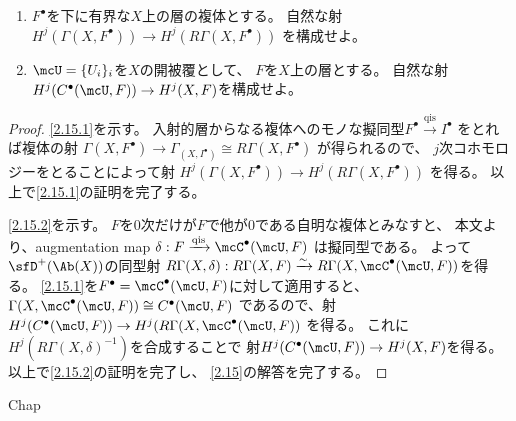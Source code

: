 \documentclass[uplatex,dvipdfmx]{jsarticle}
\begin{document}
\maketitle
\HeaderCommentA
\section{}

\fi



\begin{prob}\label{2.15}
  \begin{enumerate}
    \item \label{2.15.1}
    \(F^{\bullet}\)を下に有界な\(X\)上の層の複体とする。
    自然な射
    \(H^j(\Gamma(X,F^{\bullet})) \to H^j(R\Gamma(X,F^{\bullet}))\)
    を構成せよ。
    \item \label{2.15.2}
    \(\mcU = \{U_i\}_i\)を\(X\)の開被覆として、
    \(F\)を\(X\)上の層とする。
    自然な射\(H^j(C^{\bullet}(\mcU,F)) \to H^j(X,F)\)を構成せよ。
  \end{enumerate}
\end{prob}

\begin{proof}
  \ref{2.15.1}を示す。
  入射的層からなる複体へのモノな擬同型\(F^{\bullet}\xrightarrow{\text{qis}}I^{\bullet}\)
  をとれば複体の射
  \(\Gamma(X,F^{\bullet})\to \Gamma_(X,I^{\bullet})\cong R\Gamma(X,F^{\bullet})\)
  が得られるので、
  \(j\)次コホモロジーをとることによって射
  \(H^j(\Gamma(X,F^{\bullet})) \to H^j(R\Gamma(X,F^{\bullet}))\)
  を得る。
  以上で\ref{2.15.1}の証明を完了する。

  \ref{2.15.2}を示す。
  \(F\)を\(0\)次だけが\(F\)で他が\(0\)である自明な複体とみなすと、
  本文\cite[Proposition 2.8.4]{kashiwara2002sheaves}より、augmentation map
  \(\delta:F\xrightarrow{\text{qis}} \mcC^{\bullet}(\mcU,F)\)
  は擬同型である。
  よって\(\sfD^+(\Ab(X))\)の同型射
  \(R\Gamma(X,\delta):R\Gamma(X,F)\xrightarrow{\sim}
  R\Gamma(X,\mcC^{\bullet}(\mcU,F))\)を得る。
  \ref{2.15.1}を\(F^{\bullet} = \mcC^{\bullet}(\mcU,F)\)に対して適用すると、
  \(\Gamma(X,\mcC^{\bullet}(\mcU,F)) \cong C^{\bullet}(\mcU,F)\)
  であるので、射
  \(H^j(C^{\bullet}(\mcU,F)) \to H^j(R\Gamma(X,\mcC^{\bullet}(\mcU,F))\)
  を得る。
  これに\(H^j(R\Gamma(X,\delta)^{-1})\)を合成することで
  射\(H^j(C^{\bullet}(\mcU,F))\to H^j(X,F)\)を得る。
  以上で\ref{2.15.2}の証明を完了し、
  \autoref{2.15}の解答を完了する。
\end{proof}




\ifcsname Chap\endcsname\else
\printbibliography
\end{document}
